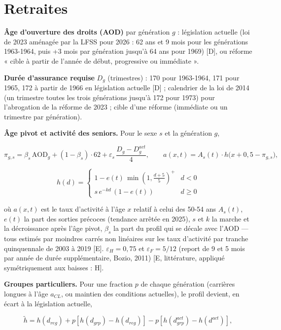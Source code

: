 \documentclass[
  11pt,
  11pt,
  a4paper,
  openany]{book}
\begin{document}
\hypertarget{sec:eq-retraites}{%
\section{Retraites}\label{sec:eq-retraites}}

\textbf{Âge d'ouverture des droits (AOD)} par génération \(g\) :
législation actuelle (loi de 2023 aménagée par la LFSS pour 2026 : 62
ans et 9 mois pour les générations 1963-1964, puis +3 mois par
génération jusqu'à 64 ans pour 1969) {[}D{]}, ou réforme « cible à
partir de l'année de début, progressive ou immédiate ».

\textbf{Durée d'assurance requise} \(D_g\) (trimestres) : 170 pour
1963-1964, 171 pour 1965, 172 à partir de 1966 en législation actuelle
{[}D{]} ; calendrier de la loi de 2014 (un trimestre toutes les trois
générations jusqu'à 172 pour 1973) pour l'abrogation de la réforme de
2023 ; cible d'une réforme (immédiate ou un trimestre par génération).

\textbf{Âge pivot et activité des seniors.} Pour le sexe \(s\) et la
génération \(g\),

\[\pi_{g,s} = \beta_s\,\text{AOD}_g + (1 - \beta_s)\cdot 62 + \varepsilon_s\,\frac{D_g - D^{act}_g}{4}, \qquad
a(x,t) = A_s(t)\cdot h\big(x + 0{,}5 - \pi_{g,s}\big),\]

\[h(d) = \begin{cases} 1 - e(t)\,\min\left(1, \frac{d+5}{5}\right)^+ & d < 0 \\ s\,e^{-k d}\,(1 - e(t)) & d \ge 0 \end{cases}\]

où \(a(x,t)\) est le taux d'activité à l'âge \(x\) relatif à celui des
50-54 ans \(A_s(t)\), \(e(t)\) la part des sorties précoces (tendance
arrêtée en 2025), \(s\) et \(k\) la marche et la décroissance après
l'âge pivot, \(\beta_s\) la part du profil qui se décale avec l'AOD ---
tous estimés par moindres carrés non linéaires sur les taux d'activité
par tranche quinquennale de 2003 à 2019 {[}E{]}.
\(\varepsilon_H = 0{,}75\) et \(\varepsilon_F = 5/12\) (report de 9 et 5
mois par année de durée supplémentaire, Bozio, 2011) {[}E, littérature,
appliqué symétriquement aux baisses : H{]}.

\textbf{Groupes particuliers.} Pour une fraction \(p\) de chaque
génération (carrières longues à l'âge \(a_{CL}\), ou maintien des
conditions actuelles), le profil devient, en écart à la législation
actuelle,

\[\tilde h = h(d_{reg}) + p\left[h(d_{grp}) - h(d_{reg})\right] - p\left[h(d^{act}_{grp}) - h(d^{act})\right],\]
\end{document}

